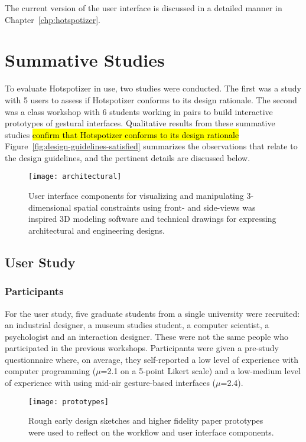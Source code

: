The current version of the user interface is discussed in a detailed manner in Chapter~\ref{chp:hotspotizer}.

\section{Summative Studies}
\label{sec:summative-studies}

To evaluate Hotspotizer in use, two studies were conducted. The first was a study with 5 users to assess if Hotspotizer conforms to its design rationale. The second was a class workshop with 6 students working in pairs to build interactive prototypes of gestural interfaces. Qualitative results from these summative studies \hl{confirm that Hotspotizer conforms to its design rationale} Figure~\ref{fig:design-guidelines-satisfied} summarizes the observations that relate to the design guidelines, and the pertinent details are discussed below.

\begin{figure}[t]
\centering
\texttt{[image: architectural]}
\caption{User interface components for visualizing and manipulating 3-dimensional spatial constraints using front- and side-views was inspired 3D modeling software and technical drawings for expressing architectural and engineering designs.}
\label{fig:architectural}
\end{figure}

\subsection{User Study}

\subsubsection{Participants}

For the user study, five graduate students from a single university were recruited: an industrial designer, a museum studies student, a computer scientist, a psychologist and an interaction designer. These were not the same people who participated in the previous workshops. Participants were given a pre-study questionnaire where, on average, they self-reported a low level of experience with computer programming ($\mu$=2.1 on a 5-point Likert scale) and a low-medium level of experience with using mid-air gesture-based interfaces ($\mu$=2.4).

\begin{figure}[t]
\centering
\texttt{[image: prototypes]}
\caption{Rough early design sketches and higher fidelity paper prototypes were used to reflect on the workflow and user interface components.}
\label{fig:prototypes}
\end{figure}


